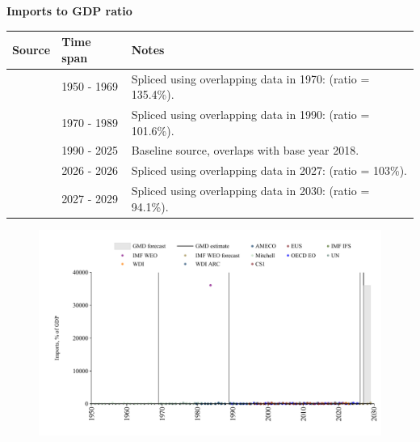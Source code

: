 \documentclass[12pt,a4paper,landscape]{article}
\begin{document}
\begin{adjustbox}{max totalsize={\paperwidth}{\paperheight},center}
\begin{minipage}[t][\textheight][t]{\textwidth}
\vspace*{0.5cm}
{}
\begin{center}
{\Large\bfseries Imports to GDP ratio}
\end{center}
\vspace{0.5cm}
\begin{table}[H]
\centering
\small
\begin{tabular}{|l|l|l|}
\hline
\textbf{Source} & \textbf{Time span} & \textbf{Notes} \\
\hline
\rowcolor{white}\cite{Mitchell}& 1950 - 1969 &Spliced using overlapping data in 1970: (ratio = 135.4\%). \\
\rowcolor{lightgray}\cite{UN}& 1970 - 1989 &Spliced using overlapping data in 1990: (ratio = 101.6\%). \\
\rowcolor{white}\cite{OECD_EO}& 1990 - 2025 &Baseline source, overlaps with base year 2018. \\
\rowcolor{lightgray}\cite{AMECO}& 2026 - 2026 &Spliced using overlapping data in 2027: (ratio = 103\%). \\
\rowcolor{white}\cite{IMF_WEO_forecast}& 2027 - 2029 &Spliced using overlapping data in 2030: (ratio = 94.1\%). \\
\hline
\end{tabular}
\end{table}
\begin{figure}[H]
\centering
\includegraphics[width=\textwidth,height=0.6\textheight,keepaspectratio]{graphs/POL_imports_GDP.pdf}
\end{figure}
\end{minipage}
\end{adjustbox}
\end{document}
